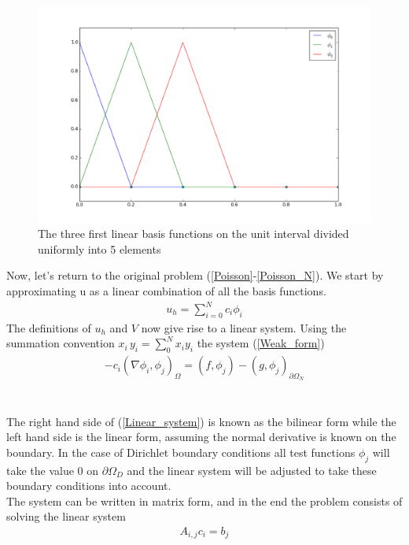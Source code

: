 \begin{figure}
  \begin{center}
    \includegraphics[scale=0.4]{figures/hats.png}
  \end{center}
	\caption{The three first linear basis functions on the unit interval divided uniformly into 5 elements}
\end{figure}
Now, let's return to the original problem (\ref{Poisson}-\ref{Poisson_N}). We start by approximating u as a linear combination of all the basis functions. 
\begin{align}
u_h = \sum_{i=0}^N c_i \phi_i \label{u_hsum}
\end{align}
The definitions of $u_h$ and $V$ now give rise to a linear system. Using the summation convention $x_i\,y_i = \sum_0^N x_i y_i $ the system (\ref{Weak_form})
\begin{align}
-c_i(\nabla \phi_i, \phi_j)_\Omega = (f,\phi_j) - (g, \phi_j)_{\partial \Omega_N} \label{Linear_system}
\end{align}
\\
\\

The right hand side of (\ref{Linear_system}) is known as the bilinear form while the left hand side is the linear form, assuming the normal derivative is known on the boundary. In the case of Dirichlet boundary conditions all test functions $\phi_j$ will take the value 0 on $\partial \Omega_D$ and the linear system will be adjusted to take these boundary conditions into account. \\
The system can be written in matrix form, and in the end the problem consists of solving the linear system
\begin{align} A_{i,j}c_i = b_j \label{Matrix_1} \end{align}
